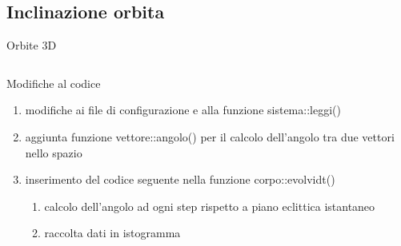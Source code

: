     \subsection[\theta]{Inclinazione orbita}
        \begin{frame}{Orbite 3D}
            \begin{columns}
                    \begin{block}{Modifiche al codice}
                        \begin{enumerate}
                            \item modifiche ai file di configurazione e alla funzione sistema::leggi()
                            \item aggiunta funzione vettore::angolo() per il calcolo dell'angolo tra due vettori nello spazio
                            \item inserimento del codice seguente nella funzione corpo::evolvidt()
                            \begin{enumerate}[i]
                                \item calcolo dell'angolo ad ogni step rispetto a piano eclittica istantaneo
                                \item raccolta dati in istogramma
                            \end{enumerate}
                        \end{enumerate}
                    \end{block}
                    
            \end{columns}
        \end{frame}
        
